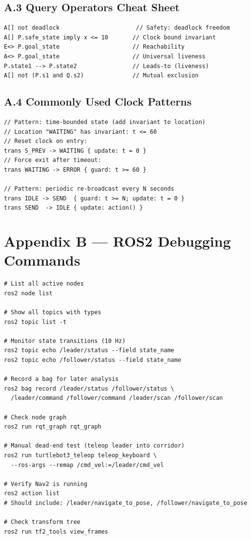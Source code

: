 \documentclass[11pt, a4paper]{article}
\begin{document}
\subsection*{A.3 Query Operators Cheat Sheet}

\begin{lstlisting}[style=uppaalcode]
A[] not deadlock                      // Safety: deadlock freedom
A[] P.safe_state imply x <= 10       // Clock bound invariant
E<> P.goal_state                     // Reachability
A<> P.goal_state                     // Universal liveness
P.state1 --> P.state2                // Leads-to (liveness)
A[] not (P.s1 and Q.s2)              // Mutual exclusion
\end{lstlisting}

\subsection*{A.4 Commonly Used Clock Patterns}

\begin{lstlisting}[style=uppaalcode]
// Pattern: time-bounded state (add invariant to location)
// Location "WAITING" has invariant: t <= 60
// Reset clock on entry:
trans S_PREV -> WAITING { update: t = 0 }
// Force exit after timeout:
trans WAITING -> ERROR { guard: t >= 60 }

// Pattern: periodic re-broadcast every N seconds
trans IDLE -> SEND  { guard: t >= N; update: t = 0 }
trans SEND  -> IDLE { update: action() }
\end{lstlisting}

\section*{Appendix B — ROS2 Debugging Commands}

\begin{lstlisting}[style=shellcode]
# List all active nodes
ros2 node list

# Show all topics with types
ros2 topic list -t

# Monitor state transitions (10 Hz)
ros2 topic echo /leader/status --field state_name
ros2 topic echo /follower/status --field state_name

# Record a bag for later analysis
ros2 bag record /leader/status /follower/status \
  /leader/command /follower/command /leader/scan /follower/scan

# Check node graph
ros2 run rqt_graph rqt_graph

# Manual dead-end test (teleop leader into corridor)
ros2 run turtlebot3_teleop teleop_keyboard \
  --ros-args --remap /cmd_vel:=/leader/cmd_vel

# Verify Nav2 is running
ros2 action list
# Should include: /leader/navigate_to_pose, /follower/navigate_to_pose

# Check transform tree
ros2 run tf2_tools view_frames
\end{lstlisting}
\end{document}
